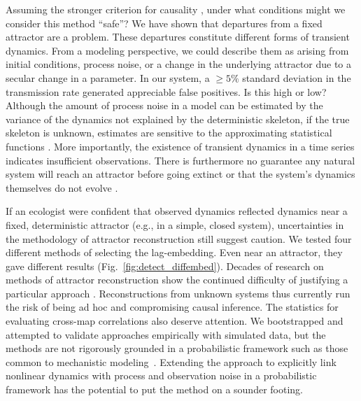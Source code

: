 Assuming the stronger criterion for causality \cite{Ye2015}, under what conditions might we consider this method ``safe''?
We have shown that departures from a fixed attractor are a problem.
These departures constitute different forms of transient dynamics.
From a modeling perspective, we could describe them as arising from initial conditions, process noise, or a change in the underlying attractor due to a secular change in a parameter.
In our system, a $\geq5\%$ standard deviation in the transmission rate generated appreciable false positives.
Is this high or low?
Although the amount of process noise in a model can be estimated by the variance of the dynamics not explained by the deterministic skeleton, if the true skeleton is unknown, estimates are sensitive to the approximating statistical functions \cite{Ellner1995}.
More importantly, the existence of transient dynamics in a time series indicates insufficient observations.
There is furthermore no guarantee any natural system will reach an attractor before going extinct or that the system's dynamics themselves do not evolve \cite{Turchin2003}.

If an ecologist were confident that observed dynamics reflected dynamics near a fixed, deterministic attractor (e.g., in a simple, closed system), uncertainties in the methodology of attractor reconstruction still suggest caution.
We tested four different methods of selecting the lag-embedding.
Even near an attractor, they gave different results (Fig.~\ref{fig:detect_diffembed}).
Decades of research on methods of attractor reconstruction show the continued difficulty of justifying a particular approach \cite{Casdagli1991, Uzal2011, Nichkawde2013, Tajima2015, Sugihara1990}.
Reconstructions from unknown systems thus currently run the risk of being ad hoc and compromising causal inference.
The statistics for evaluating cross-map correlations also deserve attention.
We bootstrapped and attempted to validate approaches empirically with simulated data, but the methods are not rigorously grounded in a probabilistic framework such as those common to mechanistic modeling~\cite{HilbornMangel}.
Extending the approach to explicitly link nonlinear dynamics with process and observation noise in a probabilistic framework has the potential to put the method on a sounder footing.

